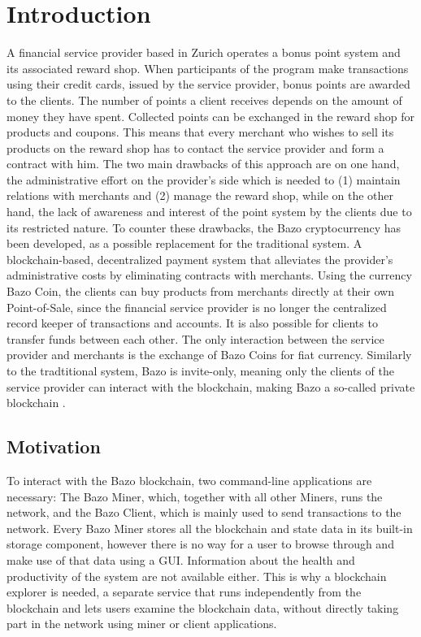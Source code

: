 \chapter{Introduction}
A financial service provider based in Zurich operates a bonus point system and its associated reward shop. When participants of the program make transactions using their credit cards, issued by the service provider, bonus points are awarded to the clients. The number of points a client receives depends on the amount of money they have spent. Collected points can be exchanged in the reward shop for products and coupons. This means that every merchant who wishes to sell its products on the reward shop has to contact the service provider and form a contract with him. The two main drawbacks of this approach are on one hand, the administrative effort on the provider's side which is needed to (1) maintain relations with merchants and (2) manage the reward shop, while on the other hand, the lack of awareness and interest of the point system by the clients due to its restricted nature.
To counter these drawbacks, the Bazo cryptocurrency has been developed, as a possible replacement for the traditional system. A blockchain-based, decentralized payment system that alleviates the provider's administrative costs by eliminating contracts with merchants. Using the currency Bazo Coin, the clients can buy products from merchants directly at their own Point-of-Sale, since the financial service provider is no longer the centralized record keeper of transactions and accounts. It is also possible for clients to transfer funds between each other. The only interaction between the service provider and merchants is the exchange of Bazo Coins for fiat currency. Similarly to the tradtitional system, Bazo is invite-only, meaning only the clients of the service provider can interact with the blockchain, making Bazo a so-called private blockchain \cite{bazo}.

\section{Motivation}
To interact with the Bazo blockchain, two command-line applications are necessary: The Bazo Miner, which, together with all other Miners, runs the network, and the Bazo Client, which is mainly used to send transactions to the network. Every Bazo Miner stores all the blockchain and state data in its built-in storage component, however there is no way for a user to browse through and make use of that data using a GUI. Information about the health and productivity of the system are not available either. This is why a blockchain explorer is needed, a separate service that runs independently from the blockchain and lets users examine the blockchain data, without directly taking part in the network using miner or client applications.

